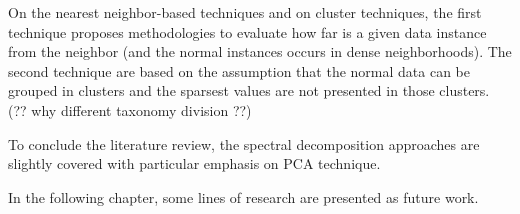 On the nearest neighbor-based techniques and on cluster techniques, the first technique proposes methodologies to evaluate how far is a given data instance from the neighbor (and the normal instances occurs in dense neighborhoods). The second technique are based on the assumption that the normal data can be grouped in clusters and the sparsest values are not presented in those clusters. (?? why different taxonomy division ??)

To conclude the literature review, the spectral decomposition approaches are slightly covered with particular emphasis on PCA technique.

In the following chapter, some lines of research are presented as future work.
